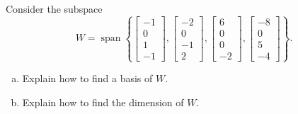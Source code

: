 
\begin{exerciseStatement}


Consider the subspace \[W=\operatorname{span}  \left\{ \left[\begin{array}{c}
-1 \\
0 \\
1 \\
-1
\end{array}\right] , \left[\begin{array}{c}
-2 \\
0 \\
-1 \\
2
\end{array}\right] , \left[\begin{array}{c}
6 \\
0 \\
0 \\
-2
\end{array}\right] , \left[\begin{array}{c}
-8 \\
0 \\
5 \\
-4
\end{array}\right] \right\} .\]


\begin{enumerate}[(a)]
\item  Explain how to find a basis of \(W\).
\item  Explain how to find the dimension of \(W\).
\end{enumerate}
    
\end{exerciseStatement}
    
